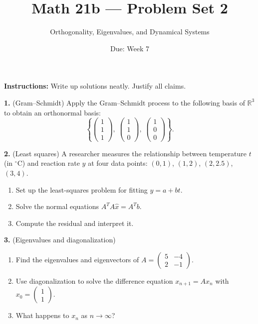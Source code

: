 \documentclass{amsart}
\title{Math 21b --- Problem Set 2}
\subtitle{Orthogonality, Eigenvalues, and Dynamical Systems}
\date{Due: Week 7}
\begin{document}
\maketitle

\textbf{Instructions:} Write up solutions neatly. Justify all claims.

\bigskip

\textbf{1.} (Gram--Schmidt) Apply the Gram--Schmidt process to the following basis of $\mathbb{R}^3$ to obtain an orthonormal basis:
\[
\left\{\begin{pmatrix}1\\1\\1\end{pmatrix},\;\begin{pmatrix}1\\1\\0\end{pmatrix},\;\begin{pmatrix}1\\0\\0\end{pmatrix}\right\}.
\]

\bigskip

\textbf{2.} (Least squares) A researcher measures the relationship between temperature $t$ (in ${}^\circ$C) and reaction rate $y$ at four data points: $(0,1)$, $(1,2)$, $(2,2.5)$, $(3,4)$.
\begin{enumerate}
    \item[(a)] Set up the least-squares problem for fitting $y = a + bt$.
    \item[(b)] Solve the normal equations $A^T A \hat{x} = A^T b$.
    \item[(c)] Compute the residual and interpret it.
\end{enumerate}

\bigskip

\textbf{3.} (Eigenvalues and diagonalization)
\begin{enumerate}
    \item[(a)] Find the eigenvalues and eigenvectors of $A = \begin{pmatrix}5&-4\\2&-1\end{pmatrix}$.
    \item[(b)] Use diagonalization to solve the difference equation $x_{n+1} = Ax_n$ with $x_0 = \begin{pmatrix}1\\1\end{pmatrix}$.
    \item[(c)] What happens to $x_n$ as $n \to \infty$?
\end{enumerate}
\end{document}
